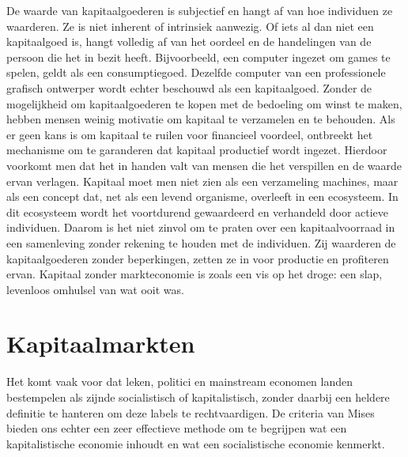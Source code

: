De waarde van kapitaalgoederen is subjectief en hangt af van hoe individuen ze waarderen. Ze is niet inherent of intrinsiek aanwezig. Of iets al dan niet een kapitaalgoed is, hangt volledig af van het oordeel en de handelingen van de persoon die het in bezit heeft. Bijvoorbeeld, een computer ingezet om games te spelen, geldt als een consumptiegoed. Dezelfde computer van een professionele grafisch ontwerper wordt echter beschouwd als een kapitaalgoed. Zonder de mogelijkheid om kapitaalgoederen te kopen met de bedoeling om winst te maken, hebben mensen weinig motivatie om kapitaal te verzamelen en te behouden. Als er geen kans is om kapitaal te ruilen voor financieel voordeel, ontbreekt het mechanisme om te garanderen dat kapitaal productief wordt ingezet. Hierdoor voorkomt men dat het in handen valt van mensen die het verspillen en de waarde ervan verlagen. Kapitaal moet men niet zien als een verzameling machines, maar als een concept dat, net als een levend organisme, overleeft in een ecosysteem. In dit ecosysteem wordt het voortdurend gewaardeerd en verhandeld door actieve individuen. Daarom is het niet zinvol om te praten over een kapitaalvoorraad in een samenleving zonder rekening te houden met de individuen. Zij waarderen de kapitaalgoederen zonder beperkingen, zetten ze in voor productie en profiteren ervan. Kapitaal zonder markteconomie is zoals een vis op het droge: een slap, levenloos omhulsel van wat ooit was.

\hypertarget{kapitaalmarkten}{%
\section{Kapitaalmarkten}\label{kapitaalmarkten}}

Het komt vaak voor dat leken, politici en mainstream economen landen bestempelen als zijnde socialistisch of kapitalistisch, zonder daarbij een heldere definitie te hanteren om deze labels te rechtvaardigen. De criteria van Mises bieden ons echter een zeer effectieve methode om te begrijpen wat een kapitalistische economie inhoudt en wat een socialistische economie kenmerkt.

